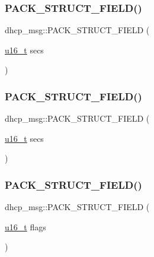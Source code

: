 \subsubsection{\texorpdfstring{P\+A\+C\+K\+\_\+\+S\+T\+R\+U\+C\+T\+\_\+\+F\+I\+E\+L\+D()}{PACK\_STRUCT\_FIELD()}\hspace{0.1cm}{\footnotesize\ttfamily [3/8]}}
{\footnotesize\ttfamily dhcp\+\_\+msg\+::\+P\+A\+C\+K\+\_\+\+S\+T\+R\+U\+C\+T\+\_\+\+F\+I\+E\+LD (\begin{DoxyParamCaption}\item[{\hyperlink{group__compiler__abstraction_ga77570ac4fcab86864fa1916e55676da2}{u16\+\_\+t}}]{secs }\end{DoxyParamCaption})}

\mbox{\label{structdhcp__msg_a1579df9397d7c34905ad94fa6b5962e1}} 
\subsubsection{\texorpdfstring{P\+A\+C\+K\+\_\+\+S\+T\+R\+U\+C\+T\+\_\+\+F\+I\+E\+L\+D()}{PACK\_STRUCT\_FIELD()}\hspace{0.1cm}{\footnotesize\ttfamily [4/8]}}
{\footnotesize\ttfamily dhcp\+\_\+msg\+::\+P\+A\+C\+K\+\_\+\+S\+T\+R\+U\+C\+T\+\_\+\+F\+I\+E\+LD (\begin{DoxyParamCaption}\item[{\hyperlink{group__compiler__abstraction_ga77570ac4fcab86864fa1916e55676da2}{u16\+\_\+t}}]{secs }\end{DoxyParamCaption})}

\mbox{\label{structdhcp__msg_a8ba3547dfd4a1ef3e96eaf5a88321c46}} 
\subsubsection{\texorpdfstring{P\+A\+C\+K\+\_\+\+S\+T\+R\+U\+C\+T\+\_\+\+F\+I\+E\+L\+D()}{PACK\_STRUCT\_FIELD()}\hspace{0.1cm}{\footnotesize\ttfamily [5/8]}}
{\footnotesize\ttfamily dhcp\+\_\+msg\+::\+P\+A\+C\+K\+\_\+\+S\+T\+R\+U\+C\+T\+\_\+\+F\+I\+E\+LD (\begin{DoxyParamCaption}\item[{\hyperlink{group__compiler__abstraction_ga77570ac4fcab86864fa1916e55676da2}{u16\+\_\+t}}]{flags }\end{DoxyParamCaption})}

